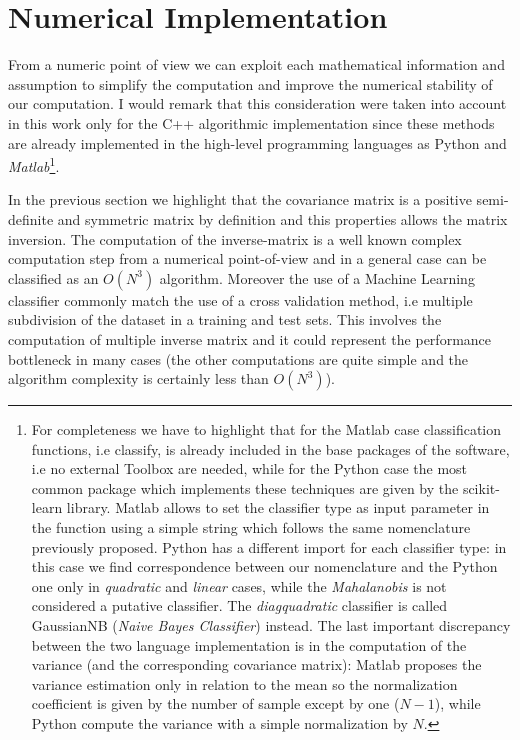 \documentclass{standalone}
\begin{document}
\section*{Numerical Implementation}

From a numeric point of view we can exploit each mathematical information and assumption to simplify the computation and improve the numerical stability of our computation.
I would remark that this consideration were taken into account in this work only for the \textsf{C++} algorithmic implementation since these methods are already implemented in the high-level programming languages as \textsf{Python} and \emph{Matlab}\footnote{
  For completeness we have to highlight that for the Matlab case classification functions, i.e \textsf{classify}, is already included in the base packages of the software, i.e no external Toolbox are needed, while for the Python case the most common package which implements these techniques are given by the \textsf{scikit-learn} library.
  Matlab allows to set the classifier type as input parameter in the function using a simple string which follows the same nomenclature previously proposed.
  Python has a different import for each classifier type: in this case we find correspondence between our nomenclature and the Python one only in \emph{quadratic} and \emph{linear} cases, while the \emph{Mahalanobis} is not considered a putative classifier.
  The \emph{diagquadratic} classifier is called \textsf{GaussianNB} (\emph{Naive Bayes Classifier}) instead.
  The last important discrepancy between the two language implementation is in the computation of the variance (and the corresponding covariance matrix): Matlab proposes the variance estimation only in relation to the mean so the normalization coefficient is given by the number of sample except by one ($N-1$), while Python compute the variance with a simple normalization by $N$.
}.

In the previous section we highlight that the covariance matrix is a positive semi-definite and symmetric matrix by definition and this properties allows the matrix inversion.
The computation of the inverse-matrix is a well known complex computation step from a numerical point-of-view and in a general case can be classified as an $O(N^3)$ algorithm.
Moreover the use of a Machine Learning classifier commonly match the use of a cross validation method, i.e multiple subdivision of the dataset in a training and test sets.
This involves the computation of multiple inverse matrix and it could represent the performance bottleneck in many cases (the other computations are quite simple and the algorithm complexity is certainly less than $O(N^3)$).
\end{document}
